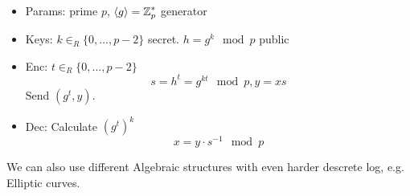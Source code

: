 \begin{itemize}
	\item Params: prime $p$, $\langle g \rangle = \operatorname{\mathbb{Z}}_p^{\ast}$ generator
	\item Keys: $k \in_R \{ 0, ..., p-2 \}$ secret.
		$h = g^k \mod p$ public
	\item Enc: $t \in_R \{ 0, ..., p-2 \}$
		\[ s = h^t = g^{kt} \mod p, y = xs \]
		Send $(g^t, y)$.
	\item Dec: Calculate $(g^t)^k$
		\[ x = y \cdot s^{-1} \mod p \]
\end{itemize}

\begin{note}
	We can also use different Algebraic structures with even harder descrete log, e.g. Elliptic curves.
\end{note}
